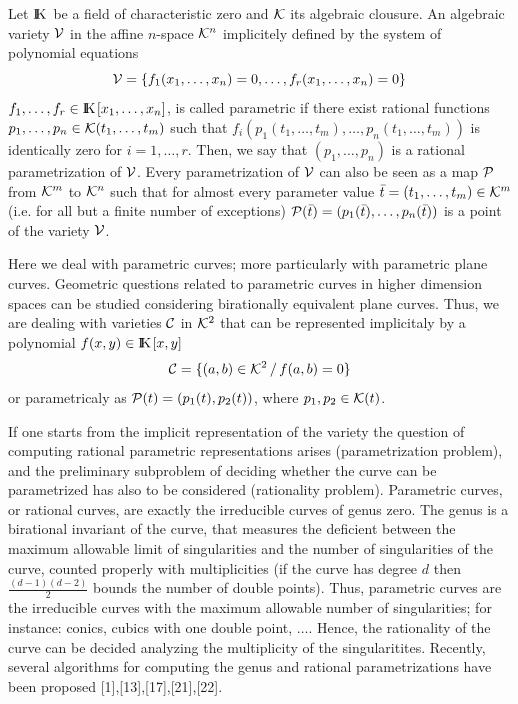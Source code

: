 Let ${\rm I\kern -2.2pt K\hskip 1pt}$ be a field of characteristic zero and ${\cal K}$ its algebraic 
clousure. An algebraic variety ${\cal V}$ in the affine $n$-space 
${\cal K}^{n}$ implicitely defined by the system of polynomial equations
\[ {\cal V}=\{ f_{1}(x_{1},\ldots,x_{n})=0,\ldots, 
f_{r}(x_{1},\ldots,x_{n})=0 \} \]
$f_{1},\ldots,f_{r}\in {\rm I\kern -2.2pt K\hskip 1pt}[x_{1},\ldots,x_{n}]$, is called parametric if 
there exist rational functions $p_{1},\ldots,p_{n} \in 
{\cal K}(t_{1},\ldots,t_{m})$ such that 
$f_{i}(p_{1}(t_{1},\ldots,t_{m}),\ldots,p_{n}(t_{1},\ldots,t_{m}))$
is identically zero for $i=1,\ldots,r$. Then, we say that $
(p_{1},\ldots,p_{n})$ is a rational  parametrization of ${\cal V}$. 
Every parametrization of ${\cal V}$ can also 
be seen as a map ${\cal P}$ from ${\cal K}^{m}$ to ${\cal K}^{n}$ such that 
for almost every parameter value $\bar{t}=(t_{1},\ldots,t_{m})\in 
{\cal K}^{m}$ (i.e. for all but a finite number of exceptions) 
${\cal P}(\bar{t})=
(p_{1}(\bar{t}),\ldots,p_{n}(\bar{t}))$ is a point of the variety 
${\cal V}$.

Here we deal with parametric curves; more particularly with parametric 
plane curves. Geometric questions related to parametric curves in higher 
dimension spaces can be studied considering birationally equivalent plane 
curves. Thus, we are dealing with varieties ${\cal C}$ in 
${\cal K}^{2}$ that can be  represented implicitaly by a polynomial 
$f(x,y)\in {\rm I\kern -2.2pt K\hskip 1pt}[x,y]$ 
\[ {\cal C}=\{ (a,b)\in {\cal K}^{2} \,/\, f(a,b)=0 \} \]
or parametricaly as ${\cal P}(t)=(p_{1}(t),p_{2}(t))$, where 
$p_{1},p_{2}\in {\cal K}(t)$. 

If one starts from the implicit representation of the variety the question 
of computing  rational parametric representations arises 
(parametrization problem), and the preliminary subproblem of deciding 
whether the curve can be parametrized has also to be considered 
(rationality problem). Parametric curves, or rational curves, are exactly  
the irreducible curves of genus zero. The genus is a birational invariant 
of the curve, that measures the deficient between the maximum allowable 
limit of singularities and the number of singularities of the curve, 
counted properly with multiplicities (if the curve has degree $d$ then 
$\frac{(d-1)(d-2)}{2}$ bounds the number of double points). Thus, 
parametric  curves  are the irreducible curves with the maximum allowable 
number of singularities; for instance: conics, cubics with one double 
point, $\ldots$. Hence, the rationality of the curve can be decided 
analyzing the multiplicity of the singularitites. Recently, several 
algorithms for computing the genus and rational parametrizations have 
been proposed [1],[13],[17],[21],[22]. 

